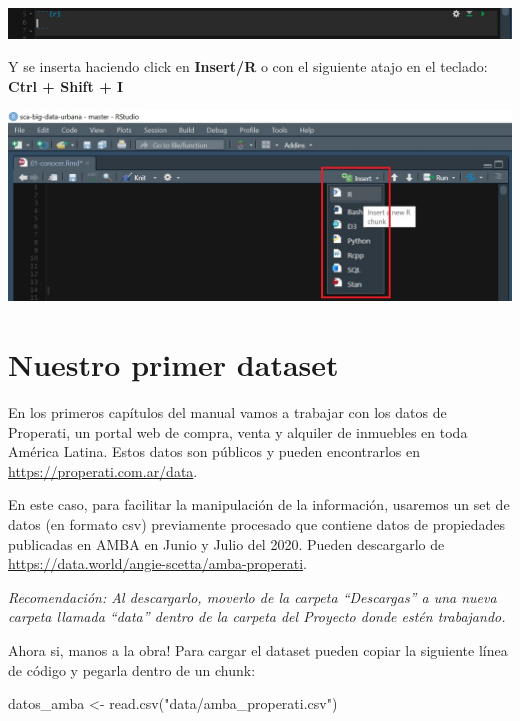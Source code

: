 \documentclass[
  spanish,
]{book}
\newenvironment{Shaded}{\begin{snugshade}}{\end{snugshade}}
\newcommand{\FunctionTok}[1]{\textcolor[rgb]{0.00,0.00,0.00}{#1}}
\newcommand{\NormalTok}[1]{#1}
\newcommand{\OtherTok}[1]{\textcolor[rgb]{0.56,0.35,0.01}{#1}}
\newcommand{\StringTok}[1]{\textcolor[rgb]{0.31,0.60,0.02}{#1}}
\begin{document}
\includegraphics{images/001.jpg}

Y se inserta haciendo click en \textbf{Insert/R} o con el siguiente atajo en el teclado: \textbf{Ctrl + Shift + I}

\includegraphics{images/002.jpg}

\hypertarget{nuestro-primer-dataset}{%
\section{Nuestro primer dataset}\label{nuestro-primer-dataset}}

En los primeros capítulos del manual vamos a trabajar con los datos de Properati, un portal web de compra, venta y alquiler de inmuebles en toda América Latina.
Estos datos son públicos y pueden encontrarlos en \url{https://properati.com.ar/data}.

En este caso, para facilitar la manipulación de la información, usaremos un set de datos (en formato csv) previamente procesado que contiene datos de propiedades publicadas en AMBA en Junio y Julio del 2020. Pueden descargarlo de \url{https://data.world/angie-scetta/amba-properati}.

\emph{Recomendación: Al descargarlo, moverlo de la carpeta ``Descargas'' a una nueva carpeta llamada ``data'' dentro de la carpeta del Proyecto donde estén trabajando.}

Ahora si, manos a la obra! Para cargar el dataset pueden copiar la siguiente línea de código y pegarla dentro de un chunk:

\begin{Shaded}
\begin{Highlighting}[]
\NormalTok{datos\_amba }\OtherTok{\textless{}{-}} \FunctionTok{read.csv}\NormalTok{(}\StringTok{"data/amba\_properati.csv"}\NormalTok{)}
\end{Highlighting}
\end{Shaded}
\end{document}
